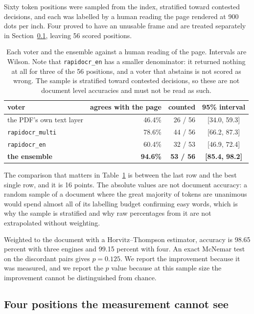 \documentclass[11pt,a4paper]{article}
\begin{document}
Sixty token positions were sampled from the index, stratified toward contested decisions,
and each was labelled by a human reading the page rendered at 900 dots per inch. Four
proved to have an unusable frame and are treated separately in
Section~\ref{sec:badbox}, leaving 56 scored positions.

\begin{table}[h]
\centering
\begin{tabular}{lrrc}
\toprule
voter & agrees with the page & counted & 95\% interval \\
\midrule
the PDF's own text layer & 46.4\% & 26 / 56 & [34.0, 59.3] \\
\texttt{rapidocr\_multi} & 78.6\% & 44 / 56 & [66.2, 87.3] \\
\texttt{rapidocr\_en} & 60.4\% & 32 / 53 & [46.9, 72.4] \\
\textbf{the ensemble} & \textbf{94.6\%} & \textbf{53 / 56} & \textbf{[85.4, 98.2]} \\
\bottomrule
\end{tabular}
\caption{Each voter and the ensemble against a human reading of the page. Intervals are
Wilson. Note that \texttt{rapidocr\_en} has a smaller denominator: it returned nothing at all
for three of the 56 positions, and a voter that abstains is not scored as wrong. The sample is
stratified toward contested decisions, so these are not document level accuracies and must not
be read as such.}
\label{tab:voters}
\end{table}

The comparison that matters in Table~\ref{tab:voters} is between the last row and the
best single row, and it is 16 points. The absolute values are not document accuracy: a
random sample of a document where the great majority of tokens are unanimous would spend
almost all of its labelling budget confirming easy words, which is why the sample is
stratified and why raw percentages from it are not extrapolated without weighting.

Weighted to the document with a Horvitz--Thompson estimator, accuracy is 98.65 percent
with three engines and 99.15 percent with four. An exact McNemar test on the discordant
pairs gives $p = 0.125$. We report the improvement because it was measured, and we report
the $p$ value because at this sample size the improvement cannot be distinguished from
chance.

\subsection{Four positions the measurement cannot see}
\label{sec:badbox}
\end{document}
